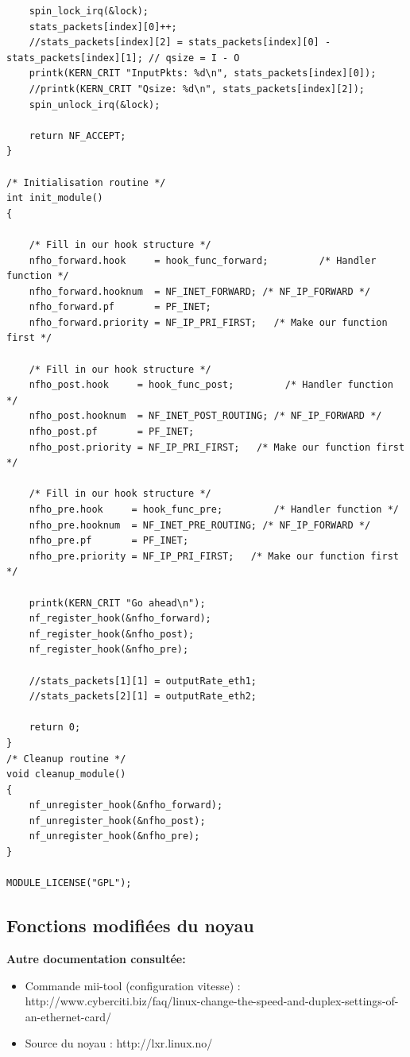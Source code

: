\documentclass[a4paper]{article}
\begin{document}
\begin{verbatim}
	spin_lock_irq(&lock);
	stats_packets[index][0]++;
	//stats_packets[index][2] = stats_packets[index][0] - stats_packets[index][1]; // qsize = I - O
	printk(KERN_CRIT "InputPkts: %d\n", stats_packets[index][0]);
	//printk(KERN_CRIT "Qsize: %d\n", stats_packets[index][2]);
	spin_unlock_irq(&lock);

	return NF_ACCEPT;
}

/* Initialisation routine */
int init_module()
{

	/* Fill in our hook structure */
	nfho_forward.hook     = hook_func_forward;         /* Handler function */
	nfho_forward.hooknum  = NF_INET_FORWARD; /* NF_IP_FORWARD */
	nfho_forward.pf       = PF_INET;
	nfho_forward.priority = NF_IP_PRI_FIRST;   /* Make our function first */

	/* Fill in our hook structure */
	nfho_post.hook     = hook_func_post;         /* Handler function */
	nfho_post.hooknum  = NF_INET_POST_ROUTING; /* NF_IP_FORWARD */
	nfho_post.pf       = PF_INET;
	nfho_post.priority = NF_IP_PRI_FIRST;   /* Make our function first */

	/* Fill in our hook structure */
	nfho_pre.hook     = hook_func_pre;         /* Handler function */
	nfho_pre.hooknum  = NF_INET_PRE_ROUTING; /* NF_IP_FORWARD */
	nfho_pre.pf       = PF_INET;
	nfho_pre.priority = NF_IP_PRI_FIRST;   /* Make our function first */

	printk(KERN_CRIT "Go ahead\n");
	nf_register_hook(&nfho_forward);
	nf_register_hook(&nfho_post);
	nf_register_hook(&nfho_pre);

	//stats_packets[1][1] = outputRate_eth1;
	//stats_packets[2][1] = outputRate_eth2;

	return 0;
}
/* Cleanup routine */
void cleanup_module()
{
	nf_unregister_hook(&nfho_forward);
	nf_unregister_hook(&nfho_post);
	nf_unregister_hook(&nfho_pre);
}

MODULE_LICENSE("GPL");

\end{verbatim}

\subsection{Fonctions modifiées du noyau}

\newpage



\textbf{Autre documentation consultée:}
\begin{itemize}
	\item Commande mii-tool (configuration vitesse) : 
	http://www.cyberciti.biz/faq/linux-change-the-speed-and-duplex-settings-of-an-ethernet-card/
	\item Source du noyau : http://lxr.linux.no/
\end{itemize}
\end{document}
